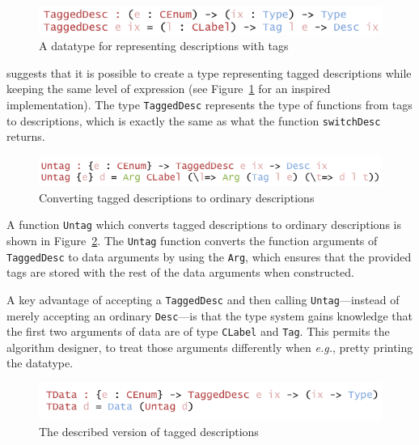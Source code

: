 \documentclass{ituthesis}
\newcommand{\ttconstructor}[1]{\textcolor{constructor-color}{\texttt{#1}}}
\newcommand{\tttype}[1]{\textcolor{type-color}{\texttt{#1}}}
\newcommand{\ttdec}[1]{\textcolor{declared-var-color}{\texttt{#1}}}
\theoremstyle{break}
\begin{document}
\begin{figure}[ht]
\begin{center}
    \includegraphics[scale=0.5]{Figures/TaggingDescriptions.png}
\end{center}
\caption{A datatype for representing descriptions with tags}
\label{fig:tagdesc}
\end{figure}

\textcite{Dagand2013acosmology} suggests that it is possible to create a type representing tagged descriptions while keeping
the same level of expression (see Figure~\ref{fig:tagdesc} for an inspired implementation).
The type \ttdec{TaggedDesc} represents the type of functions from tags to descriptions, which is exactly the same as what the function \ttdec{switchDesc} returns.

\begin{figure}[ht]
\begin{center}
    \includegraphics[scale=0.5]{Figures/DetaggingDescriptions.png}
\end{center}
\caption{Converting tagged descriptions to ordinary descriptions}
\label{fig:untagdesc}
\end{figure}

A function \ttdec{Untag} which converts tagged descriptions to ordinary descriptions is shown in Figure~\ref{fig:untagdesc}.
The \ttdec{Untag} function converts the function arguments of \tttype{TaggedDesc} to data arguments by using the \ttconstructor{Arg}, which ensures
that the provided tags are stored with the rest of the data arguments when constructed.

A key advantage of accepting a \ttdec{TaggedDesc} and then calling \ttdec{Untag}---instead of merely accepting an ordinary \tttype{Desc}---is that the type system
gains knowledge that the first two arguments of data are of type \ttdec{CLabel} and \tttype{Tag}.
This permits the algorithm designer, to treat those arguments differently when \textit{e.g.}, pretty printing the datatype.

\begin{figure}[ht]
\begin{center}
    \includegraphics[scale=0.5]{Figures/TaggedDescriptionData.png}
\end{center}
\caption{The described version of tagged descriptions}
\label{fig:tagdata}
\end{figure}
\end{document}

